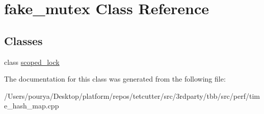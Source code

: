 \hypertarget{classfake__mutex}{}\section{fake\+\_\+mutex Class Reference}
\label{classfake__mutex}
\subsection*{Classes}
\begin{DoxyCompactItemize}
\item 
class \hyperlink{classfake__mutex_1_1scoped__lock}{scoped\+\_\+lock}
\end{DoxyCompactItemize}


The documentation for this class was generated from the following file\+:\begin{DoxyCompactItemize}
\item 
/\+Users/pourya/\+Desktop/platform/repos/tetcutter/src/3rdparty/tbb/src/perf/time\+\_\+hash\+\_\+map.\+cpp\end{DoxyCompactItemize}
